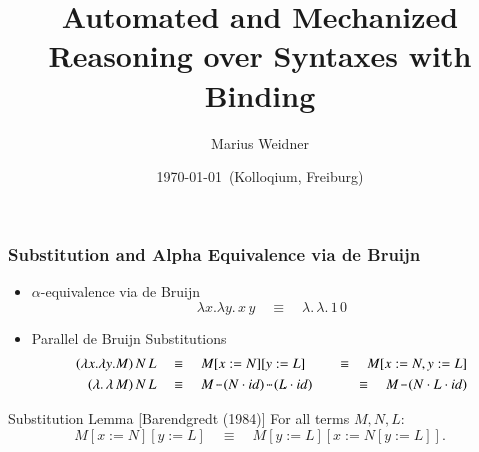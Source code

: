 \documentclass[dvipsnames,aspectratio=169,pdftex]{beamer}
\title{Automated and Mechanized Reasoning over Syntaxes with Binding}
\author{Marius Weidner}
\institute{University of Freiburg}
\date{\today \ (Kolloqium, Freiburg)}
\newcommand{\Tdot}{\mkern2mu {\cdotp} \mkern-2mu  {\cdotp} \mkern-2mu {\cdotp} \mkern1mu}
\begin{document}
\begin{frame}{\null}
  \titlepage{}
\end{frame}

\begin{frame}[fragile]
  \frametitle{Substitution and Alpha Equivalence via de Bruijn}
  \begin{itemize}
    \item $\alpha$-equivalence via de Bruijn
          \[
            \lambda x. \lambda y.\,x \,y \quad\equiv\quad \lambda.\,\lambda.\,1\,0
          \]

    \item Parallel de Bruijn Substitutions
          \begin{align*}
            (\lambda x. \lambda y. M)\,N\,L \quad & \equiv\quad M[x := N][y := L]  \quad                      & \equiv\quad M[x := N, y := L]            \\
            (\lambda.\, \lambda\, M)\,N\,L \quad  & \equiv\quad M \Tdot (N \cdot id) \Tdot (L \cdot id) \quad & \equiv\quad M \Tdot (N \cdot L \cdot id)
          \end{align*}
  \end{itemize}

  \vspace{0.6em}
  \begin{block}{Substitution Lemma [Barendgredt (1984)]}
    For all terms $M, N, L$:
    \[
      M[x := N][y := L] \quad\equiv\quad M[y := L][x := N[y := L]].
    \]
  \end{block}
\end{frame}
\end{document}
